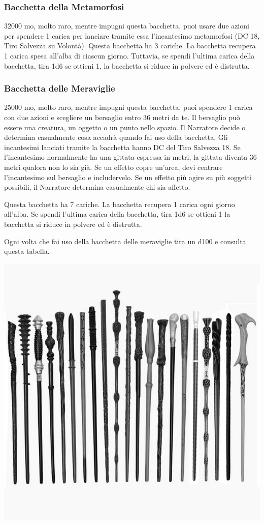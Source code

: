 \begin{multicols}{2}
	\subsubsection*{Bacchetta della Metamorfosi}
	32000 mo, molto raro, mentre impugni questa bacchetta, puoi usare due azioni per spendere 1 carica per lanciare tramite essa l'incantesimo metamorfosi (DC 18, Tiro Salvezza su Volontà). Questa bacchetta ha 3 cariche. La bacchetta recupera 1 carica spesa all'alba di ciascun giorno. Tuttavia, se spendi l'ultima carica della bacchetta, tira 1d6 se ottieni 1, la bacchetta si riduce in polvere ed è distrutta.

	\subsubsection*{Bacchetta delle Meraviglie}
	25000 mo, molto raro, mentre impugni questa bacchetta, puoi spendere 1 carica con due azioni e scegliere un bersaglio entro 36 metri da te. Il bersaglio può essere una creatura, un oggetto o un punto nello spazio. Il Narratore decide o determina casualmente cosa accadrà quando fai uso della bacchetta. Gli incantesimi lanciati tramite la bacchetta hanno DC del Tiro Salvezza 18. Se l'incantesimo normalmente ha una gittata espressa in metri, la gittata diventa 36 metri qualora non lo sia già. Se un effetto copre un'area, devi centrare l'incantesimo sul bersaglio e includervelo. Se un effetto più agire su più soggetti possibili, il Narratore determina casualmente chi sia affetto.

	Questa bacchetta ha 7 cariche. La bacchetta recupera 1 carica ogni giorno all'alba. Se spendi l'ultima carica della bacchetta, tira 1d6 se ottieni 1 la bacchetta si riduce in polvere ed è distrutta.

	Ogni volta che fai uso della bacchetta delle meraviglie tira un d100 e consulta questa tabella.

\end{multicols}

\begin{center}
	\includegraphics[width=0.3\linewidth]{immagini/bacchette.png}

\end{center}

